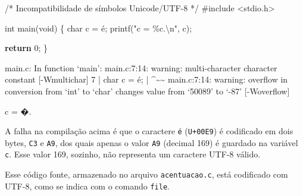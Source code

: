 \documentclass[
  letterpaper,
  DIV=11,
  numbers=noendperiod]{scrartcl}
\newenvironment{Shaded}{\begin{snugshade}}{\end{snugshade}}
\newcommand{\CharTok}[1]{\textcolor[rgb]{0.13,0.47,0.30}{#1}}
\newcommand{\CommentTok}[1]{\textcolor[rgb]{0.37,0.37,0.37}{#1}}
\newcommand{\ControlFlowTok}[1]{\textcolor[rgb]{0.00,0.23,0.31}{\textbf{#1}}}
\newcommand{\DataTypeTok}[1]{\textcolor[rgb]{0.68,0.00,0.00}{#1}}
\newcommand{\DecValTok}[1]{\textcolor[rgb]{0.68,0.00,0.00}{#1}}
\newcommand{\ImportTok}[1]{\textcolor[rgb]{0.00,0.46,0.62}{#1}}
\newcommand{\NormalTok}[1]{\textcolor[rgb]{0.00,0.23,0.31}{#1}}
\newcommand{\OperatorTok}[1]{\textcolor[rgb]{0.37,0.37,0.37}{#1}}
\newcommand{\PreprocessorTok}[1]{\textcolor[rgb]{0.68,0.00,0.00}{#1}}
\newcommand{\SpecialCharTok}[1]{\textcolor[rgb]{0.37,0.37,0.37}{#1}}
\newcommand{\StringTok}[1]{\textcolor[rgb]{0.13,0.47,0.30}{#1}}
\begin{document}
\begin{Shaded}
\begin{Highlighting}[]
\CommentTok{/*}
\CommentTok{Incompatibilidade de símbolos Unicode/UTF{-}8}
\CommentTok{*/}
\PreprocessorTok{\#include }\ImportTok{\textless{}stdio.h\textgreater{}}

\DataTypeTok{int}\NormalTok{ main}\OperatorTok{(}\DataTypeTok{void}\OperatorTok{)} \OperatorTok{\{}
    \DataTypeTok{char}\NormalTok{ c }\OperatorTok{=} \CharTok{\textquotesingle{}é\textquotesingle{}}\OperatorTok{;}
\NormalTok{    printf}\OperatorTok{(}\StringTok{"c = }\SpecialCharTok{\%c}\StringTok{.}\SpecialCharTok{\textbackslash{}n}\StringTok{"}\OperatorTok{,}\NormalTok{ c}\OperatorTok{);}

    \ControlFlowTok{return} \DecValTok{0}\OperatorTok{;}
\OperatorTok{\}}
\end{Highlighting}
\end{Shaded}

\begin{Shaded}
\begin{Highlighting}[]
\NormalTok{main.c: In function ‘main’:}
\NormalTok{main.c:7:14: warning: multi{-}character character constant [{-}Wmultichar]}
\NormalTok{    7 |     char c = \textquotesingle{}é\textquotesingle{};}
\NormalTok{      |              \^{}\textasciitilde{}\textasciitilde{}}
\NormalTok{main.c:7:14: warning: overflow in conversion from ‘int’ to ‘char’ }
\NormalTok{changes value from ‘50089’ to ‘{-}87’ [{-}Woverflow]}
\end{Highlighting}
\end{Shaded}

\begin{Shaded}
\begin{Highlighting}[]
\NormalTok{c = �.}
\end{Highlighting}
\end{Shaded}

A falha na compilação acima é que o caractere \texttt{é}
(\texttt{U+00E9}) é codificado em dois bytes, \texttt{C3} e \texttt{A9},
dos quais apenas o valor \texttt{A9} (decimal 169) é guardado na
variável \texttt{c}. Esse valor 169, sozinho, não representa um
caractere UTF-8 válido.

Esse código fonte, armazenado no arquivo \texttt{acentuacao.c}, está
codificado com UTF-8, como se indica com o comando \texttt{file}.

\begin{Shaded}
\end{Shaded}
\end{document}
